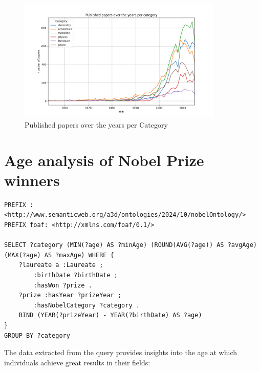 \documentclass{article}
\begin{document}
\begin{figure}[ht]
	\label{fig:papersPerCategory}
	\centering
	\includegraphics[width=0.87\textwidth]{../queries/plots/papersPerCategory.png}
	\caption{Published papers over the years per Category}
\end{figure}

\newpage

\section{Age analysis of Nobel Prize winners} \label{winners age}
\begin{lstlisting}
PREFIX : <http://www.semanticweb.org/a3d/ontologies/2024/10/nobelOntology/>
PREFIX foaf: <http://xmlns.com/foaf/0.1/>

SELECT ?category (MIN(?age) AS ?minAge) (ROUND(AVG(?age)) AS ?avgAge) (MAX(?age) AS ?maxAge) WHERE {
    ?laureate a :Laureate ;
        :birthDate ?birthDate ;
        :hasWon ?prize .
    ?prize :hasYear ?prizeYear ;
        :hasNobelCategory ?category .
    BIND (YEAR(?prizeYear) - YEAR(?birthDate) AS ?age)
}
GROUP BY ?category
\end{lstlisting}

\vspace{1em}

The data extracted from the query provides insights into the age at which individuals achieve great results in
their fields:
\end{document}

